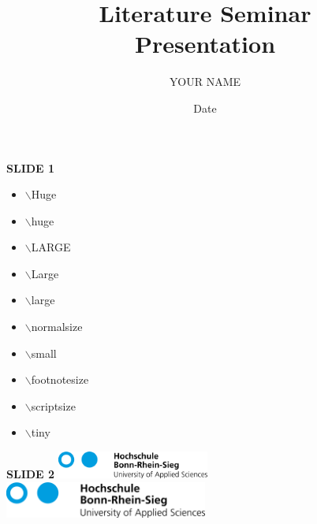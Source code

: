 \documentclass[11pt,vertical]{beamer}
\title{ \textcolor{HBRS}{\Huge\textbf{Literature Seminar\\ \vspace{1cm} Presentation}} }
\author{YOUR NAME}
\date{Date}
\begin{document}
\frame{\titlepage}


\begin{frame}{\small \textbf{SLIDE 1}}
	
	\begin{itemize}
	    \item \Huge  $\backslash$Huge
	    \item \huge  $\backslash$huge
	    \item \LARGE $\backslash$LARGE
	    \item \Large $\backslash$Large
	    \item \large $\backslash$large
	    \item \normalsize $\backslash$normalsize
	    \item \small $\backslash$small
	    \item \footnotesize $\backslash$footnotesize
	    \item \scriptsize $\backslash$scriptsize
	    \item \tiny $\backslash$tiny
  \end{itemize}

\end{frame}


\begin{frame}{\small \textbf{SLIDE 2}}
	\centering
	\includegraphics[width=5.0cm]{logo_hbrs}\vfill
	\includegraphics[width=0.5\textwidth]{logo_hbrs}
\end{frame}
\end{document}
